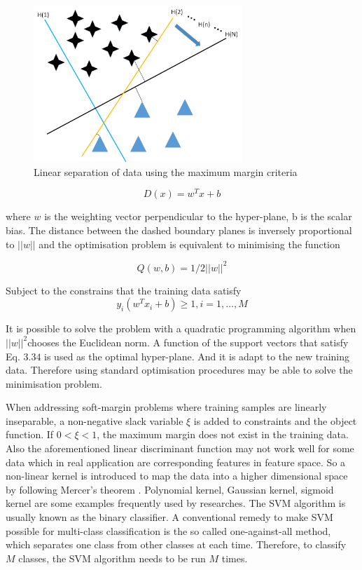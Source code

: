   
\begin{figure}[htb!]
\centering
\includegraphics[width=0.7\textwidth]{image/Method/SVM.png}
\caption[A SVM classifier]{Linear separation of data using the maximum margin criteria}
\label{fig:SVM_b}
\end{figure}
  
  
\begin{equation}
D(x)=w^{T}x+b   
\end{equation}  
    
  

where $w$ is the weighting vector perpendicular to the hyper-plane, b is the scalar bias. The distance between the dashed boundary planes is inversely proportional to $||w||$ and the optimisation problem is equivalent to minimising the function

\begin{equation}
Q(w,b)=1/2||w||^{2} 
\end{equation}

Subject to the constrains that the training data satisfy
\begin{equation}
y_{i}(w^{T}x_{i}+b) \geq 1, i=1,…,M 
\end{equation}



It is possible to solve the problem with a quadratic programming algorithm when $||w||^{2}$chooses the Euclidean norm. A function of the support vectors that satisfy Eq. $3.34$ is used as the optimal hyper-plane. And it is adapt to the new training data. Therefore using standard optimisation procedures may be able to solve the minimisation problem. 

When addressing soft-margin problems where training samples are linearly inseparable, a non-negative slack variable $\xi$ is added to constraints and the object function. If $0< \xi <1$, the maximum margin does not exist in the training data. Also the aforementioned linear discriminant function may not work well for some data which in real application are corresponding features in feature space. So a non-linear kernel is introduced to map the data into a higher dimensional space by following Mercer’s theorem \citep{burges1998tutorial}. Polynomial kernel, Gaussian kernel, sigmoid kernel are some examples frequently used by researches.
The SVM algorithm is usually known as the binary classifier. A conventional remedy to make SVM possible for multi-class classification is the so called one-against-all method, which separates one class from other classes at each time. Therefore, to classify $M$ classes, the SVM algorithm needs to be run $M$ times. 


